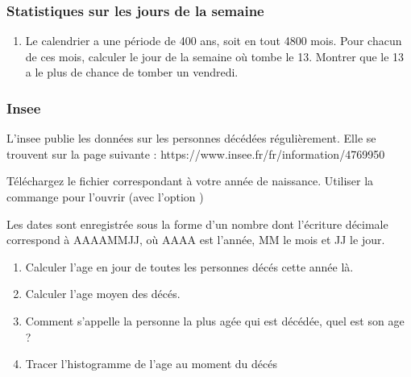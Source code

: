 \documentclass[letterpaper,10pt,english]{sphinxhowto}
\begin{document}
\subsubsection{Statistiques sur les jours de la semaine}
\label{\detokenize{devoir_maison_Devoir Maison:statistiques-sur-les-jours-de-la-semaine}}\begin{enumerate}
%
\setcounter{enumi}{14}
\item {} 
\sphinxAtStartPar
Le calendrier a une période de 400 ans, soit en tout 4800 mois. Pour chacun de ces mois, calculer le jour de la semaine où tombe le 13. Montrer que le 13 a le plus de chance de tomber un vendredi.

\end{enumerate}


\subsubsection{Insee}
\label{\detokenize{devoir_maison_Devoir Maison:insee}}
\sphinxAtStartPar
L’insee publie les données sur les personnes décédées régulièrement. Elle se trouvent sur la page suivante : https://www.insee.fr/fr/information/4769950

\sphinxAtStartPar
Téléchargez le fichier correspondant à votre année de naissance. Utiliser la commange  pour l’ouvrir (avec l’option )

\sphinxAtStartPar
Les dates sont enregistrée sous la forme d’un nombre dont l’écriture décimale correspond à AAAAMMJJ, où AAAA est l’année, MM le mois et JJ le jour.
\begin{enumerate}
%
\setcounter{enumi}{15}
\item {} 
\sphinxAtStartPar
Calculer l’age en jour de toutes les personnes décés cette année là.

\item {} 
\sphinxAtStartPar
Calculer l’age moyen des décés.

\item {} 
\sphinxAtStartPar
Comment s’appelle la personne la plus agée qui est décédée, quel est son age ?

\item {} 
\sphinxAtStartPar
Tracer l’histogramme de l’age au moment du décés

\end{enumerate}
\end{document}
